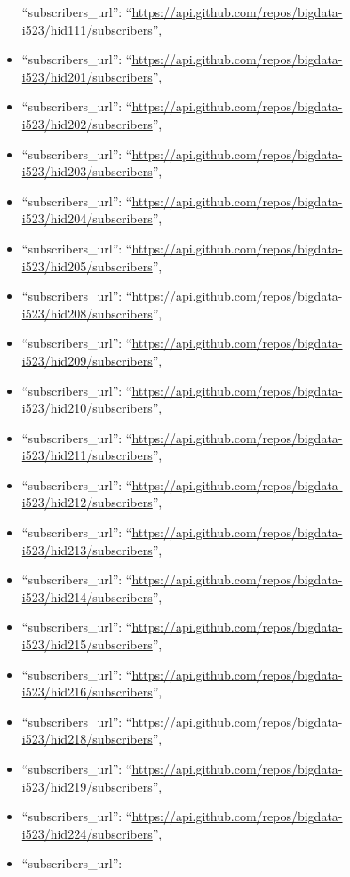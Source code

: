 \begin{itemize}
  ``subscribers\_url'':
  ``\url{https://api.github.com/repos/bigdata-i523/hid111/subscribers}'',
\item
  ``subscribers\_url'':
  ``\url{https://api.github.com/repos/bigdata-i523/hid201/subscribers}'',
\item
  ``subscribers\_url'':
  ``\url{https://api.github.com/repos/bigdata-i523/hid202/subscribers}'',
\item
  ``subscribers\_url'':
  ``\url{https://api.github.com/repos/bigdata-i523/hid203/subscribers}'',
\item
  ``subscribers\_url'':
  ``\url{https://api.github.com/repos/bigdata-i523/hid204/subscribers}'',
\item
  ``subscribers\_url'':
  ``\url{https://api.github.com/repos/bigdata-i523/hid205/subscribers}'',
\item
  ``subscribers\_url'':
  ``\url{https://api.github.com/repos/bigdata-i523/hid208/subscribers}'',
\item
  ``subscribers\_url'':
  ``\url{https://api.github.com/repos/bigdata-i523/hid209/subscribers}'',
\item
  ``subscribers\_url'':
  ``\url{https://api.github.com/repos/bigdata-i523/hid210/subscribers}'',
\item
  ``subscribers\_url'':
  ``\url{https://api.github.com/repos/bigdata-i523/hid211/subscribers}'',
\item
  ``subscribers\_url'':
  ``\url{https://api.github.com/repos/bigdata-i523/hid212/subscribers}'',
\item
  ``subscribers\_url'':
  ``\url{https://api.github.com/repos/bigdata-i523/hid213/subscribers}'',
\item
  ``subscribers\_url'':
  ``\url{https://api.github.com/repos/bigdata-i523/hid214/subscribers}'',
\item
  ``subscribers\_url'':
  ``\url{https://api.github.com/repos/bigdata-i523/hid215/subscribers}'',
\item
  ``subscribers\_url'':
  ``\url{https://api.github.com/repos/bigdata-i523/hid216/subscribers}'',
\item
  ``subscribers\_url'':
  ``\url{https://api.github.com/repos/bigdata-i523/hid218/subscribers}'',
\item
  ``subscribers\_url'':
  ``\url{https://api.github.com/repos/bigdata-i523/hid219/subscribers}'',
\item
  ``subscribers\_url'':
  ``\url{https://api.github.com/repos/bigdata-i523/hid224/subscribers}'',
\item
  ``subscribers\_url'':

\end{itemize}
